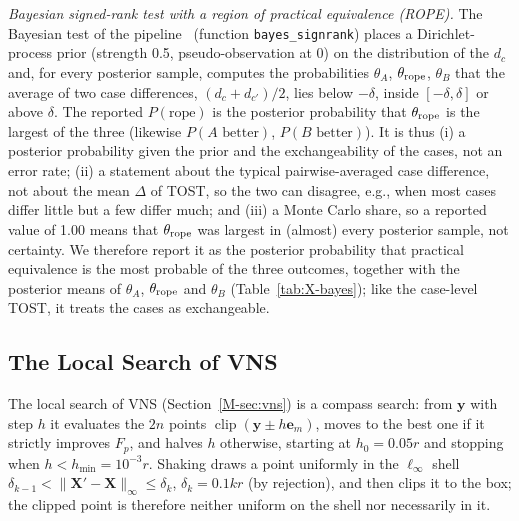 \emph{Bayesian signed-rank test with a region of practical equivalence (ROPE).} The Bayesian test of the pipeline~\cite{Benavoli2017} (function \texttt{bayes\_signrank}) places a Dirichlet-process prior (strength 0.5, pseudo-observation at 0) on the distribution of the $d_c$ and, for every posterior sample, computes the probabilities $\theta_A$, $\theta_{\rm rope}$, $\theta_B$ that the average of two case differences, $(d_c+d_{c'})/2$, lies below $-\delta$, inside $[-\delta,\delta]$ or above $\delta$. The reported $P(\text{rope})$ is the posterior probability that $\theta_{\rm rope}$ is the largest of the three (likewise $P(A\text{ better})$, $P(B\text{ better})$). It is thus (i) a posterior probability given the prior and the exchangeability of the cases, not an error rate; (ii) a statement about the typical pairwise-averaged case difference, not about the mean $\Delta$ of TOST, so the two can disagree, e.g., when most cases differ little but a few differ much; and (iii) a Monte Carlo share, so a reported value of 1.00 means that $\theta_{\rm rope}$ was largest in (almost) every posterior sample, not certainty. We therefore report it as the posterior probability that practical equivalence is the most probable of the three outcomes, together with the posterior means of $\theta_A$, $\theta_{\rm rope}$ and $\theta_B$ (Table~\ref{tab:X-bayes}); like the case-level TOST, it treats the cases as exchangeable.

\subsection{The Local Search of VNS}
\label{sec:S-th-vns}
The local search of VNS (Section~\ref{M-sec:vns}) is a compass search: from $\mathbf y$ with step $h$ it evaluates the $2n$ points $\operatorname{clip}(\mathbf y\pm h\mathbf e_m)$, moves to the best one if it strictly improves $F_p$, and halves $h$ otherwise, starting at $h_0=0.05r$ and stopping when $h<h_{\min}=10^{-3}r$. Shaking draws a point uniformly in the $\ell_\infty$ shell $\delta_{k-1}<\lVert\mathbf X'-\mathbf X\rVert_\infty\le\delta_k$, $\delta_k=0.1kr$ (by rejection), and then clips it to the box; the clipped point is therefore neither uniform on the shell nor necessarily in it.

